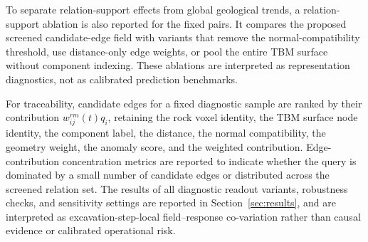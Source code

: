 To separate relation-support effects from global geological trends, a
relation-support ablation is also reported for the fixed pairs. It compares
the proposed screened candidate-edge field with variants that remove the
normal-compatibility threshold, use distance-only edge weights, or pool the
entire TBM surface without component indexing. These ablations are interpreted
as representation diagnostics, not as calibrated prediction benchmarks.

For traceability, candidate edges for a fixed diagnostic sample are ranked by
their contribution $w_{ij}^{rm}(t)q_i$, retaining the rock voxel identity, the
TBM surface node identity, the component label, the distance, the normal
compatibility, the geometry weight, the anomaly score, and the weighted
contribution. Edge-contribution concentration metrics are reported to indicate
whether the query is dominated by a small number of candidate edges or
distributed across the screened relation set. The results of all diagnostic
readout variants, robustness checks, and sensitivity settings are reported in
Section~\ref{sec:results}, and are interpreted as excavation-step-local
field--response co-variation rather than causal evidence or calibrated
operational risk.
